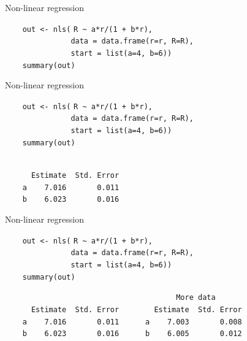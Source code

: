 \documentclass[aspectratio=169,12pt,t]{beamer}
\begin{document}
\begin{frame}[fragile]{Non-linear regression}

\vspace{5mm}

{
\verb|    out <- nls(| {\tt \vhilit R \verb|~| a*r/(1 + b*r)}\verb|,| \\
\verb|               data = data.frame(r=r, R=R),| \\
\verb|               start = list(a=4, b=6))| \\
\verb|    summary(out)|
}


\note{
}

\end{frame}


\begin{frame}[fragile]{Non-linear regression}
\addtocounter{framenumber}{-1}

\vspace{5mm}

\verb|    out <- nls(| {\tt \vhilit R \verb|~| a*r/(1 + b*r)}\verb|,| \\
\verb|               data = data.frame(r=r, R=R),| \\
\verb|               start = list(a=4, b=6))| \\
\verb|    summary(out)|

\vspace{8mm}

{\hilit
\verb|                          | \\
\verb|      Estimate  Std. Error| \\
\verb|    a    7.016       0.011| \\
\verb|    b    6.023       0.016|
}


\note{
}

\end{frame}


\begin{frame}[fragile]{Non-linear regression}
\addtocounter{framenumber}{-1}

\vspace{5mm}

\verb|    out <- nls(| {\tt \vhilit R \verb|~| a*r/(1 + b*r)}\verb|,| \\
\verb|               data = data.frame(r=r, R=R),| \\
\verb|               start = list(a=4, b=6))| \\
\verb|    summary(out)|

\vspace{8mm}

{\hilit
\verb|                                       More data      | \\
\verb|      Estimate  Std. Error        Estimate  Std. Error| \\
\verb|    a    7.016       0.011      a    7.003       0.008| \\
\verb|    b    6.023       0.016      b    6.005       0.012|
}


\note{
}

\end{frame}
\end{document}
